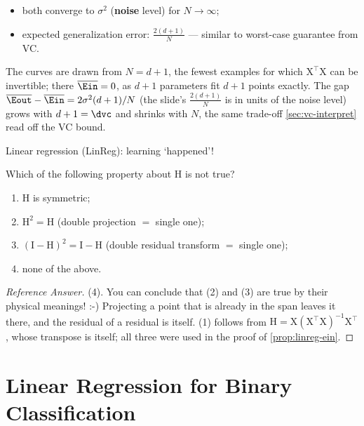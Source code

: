 \begin{itemize}
    \item both converge to \(\sigma^2\) (\textbf{noise} level) for \(N \to
        \infty\);
    \item expected generalization error: \(\frac{2(d+1)}{N}\) --- similar to
        worst-case guarantee from VC.
\end{itemize}

The curves are drawn from \(N = d + 1\), the fewest examples for which
\(\mathrm{X}^\top \mathrm{X}\) can be invertible; there \(\overline{\Ein} =
0\), as \(d + 1\) parameters fit \(d + 1\) points exactly. The gap
\(\overline{\Eout} - \overline{\Ein} = 2 \sigma^2 (d+1) / N\) (the slide's
\(\frac{2(d+1)}{N}\) is in units of the noise level) grows with \(d + 1 =
\dvc\) and shrinks with \(N\), the same trade-off \autoref{sec:vc-interpret}
read off the VC bound.

\begin{moral}
    Linear regression (LinReg): learning `happened'!
\end{moral}

\begin{exercise}
    Which of the following property about \(\mathrm{H}\) is not true?
    \begin{enumerate}[(1)]
        \item \(\mathrm{H}\) is symmetric;
        \item \(\mathrm{H}^2 = \mathrm{H}\) (double projection \(=\) single
            one);
        \item \((\mathrm{I} - \mathrm{H})^2 = \mathrm{I} - \mathrm{H}\) (double
            residual transform \(=\) single one);
        \item none of the above.
    \end{enumerate}
\end{exercise}

\begin{proof}[Reference Answer]
    (4). You can conclude that (2) and (3) are true by their physical meanings!
    :-) Projecting a point that is already in the span leaves it there, and the
    residual of a residual is itself. (1) follows from \(\mathrm{H} =
    \mathrm{X} (\mathrm{X}^\top \mathrm{X})^{-1} \mathrm{X}^\top\), whose
    transpose is itself; all three were used in the proof of
    \autoref{prop:linreg-ein}.
\end{proof}

\section{Linear Regression for Binary Classification}\label{sec:linreg-cls}

